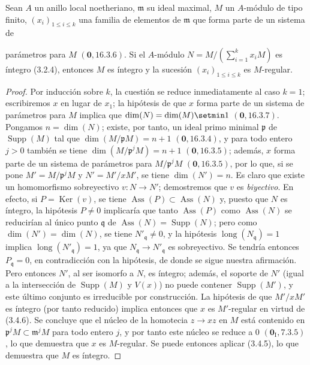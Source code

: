 \begin{corollary}[3.4.7]
\label{IV.2.3.4.7-fr}
Sean $A$ un anillo local noetheriano, $\mathfrak m$ su ideal maximal, $M$ un
$A$-módulo de tipo finito, $(x_i)_{1\leqslant i\leqslant k}$ una familia de
elementos de $\mathfrak m$ que forma parte de un sistema de


parámetros para $M$ $(\mathbf{0},16.3.6)$. Si el $A$-módulo
$N=M/(\sum_{i=1}^k x_iM)$
es íntegro \textup{(3.2.4)}, entonces $M$ es íntegro y la sucesión
$(x_i)_{1\leqslant i\leqslant k}$ es $M$-regular.
\end{corollary}

\begin{proof}
Por inducción sobre $k$, la cuestión se reduce inmediatamente al caso $k=1$; escribiremos
$x$ en lugar de $x_1$; la hipótesis de que $x$ forma parte de un sistema de
parámetros para $M$ implica que
$\dim(N)=\dim(M)\setmin 1$ $(\mathbf{0},16.3.7)$. Pongamos $n=\dim(N)$; existe, por tanto,
un ideal primo minimal $\mathfrak p$ de $\operatorname{Supp}(M)$ tal que
$\dim(M/\mathfrak pM)=n+1$ $(\mathbf{0},16.3.4)$, y para todo entero $j>0$ también se
tiene $\dim(M/\mathfrak p^jM)=n+1$ $(\mathbf{0},16.3.5)$; además, $x$ forma parte de
un sistema de parámetros para $M/\mathfrak p^jM$ $(\mathbf{0},16.3.5)$, por lo que,
si se pone $M'=M/\mathfrak p^jM$ y $N'=M'/xM'$, se tiene $\dim(N')=n$. Es
claro que existe un homomorfismo sobreyectivo $v:N\to N'$; demostremos que
$v$ es \emph{biyectivo}. En efecto, si $P=\operatorname{Ker}(v)$, se tiene
$\operatorname{Ass}(P)\subset\operatorname{Ass}(N)$ y, puesto que $N$ es
íntegro, la hipótesis $P\neq0$ implicaría que tanto $\operatorname{Ass}(P)$
como $\operatorname{Ass}(N)$ se reducirían al único punto
$\mathfrak q$ de $\operatorname{Ass}(N)=\operatorname{Supp}(N)$; pero como
$\dim(N')=\dim(N)$, se tiene $N'_{\mathfrak q}\neq0$, y la hipótesis
$\operatorname{long}(N_{\mathfrak q})=1$ implica
$\operatorname{long}(N'_{\mathfrak q})=1$, ya que
$N_{\mathfrak q}\to N'_{\mathfrak q}$ es sobreyectivo. Se tendría entonces
$P_{\mathfrak q}=0$, en contradicción con la hipótesis, de donde se sigue
nuestra afirmación. Pero entonces $N'$, al ser isomorfo a $N$, es íntegro;
además, el soporte de $N'$ (igual a la intersección de
$\operatorname{Supp}(M)$ y $V(x)$) no puede contener
$\operatorname{Supp}(M')$, y este último conjunto es irreducible por
construcción. La hipótesis de que $M'/xM'$ es íntegro (por tanto reducido)
implica entonces que $x$ es $M'$-regular en virtud de (3.4.6). Se concluye
que el núcleo de la homotecia $z\to xz$ en $M$ está contenido en
$\mathfrak p^jM\subset\mathfrak m^jM$ para todo entero $j$, y por tanto este
núcleo se reduce a $0$ $(\mathbf{0}_{\mathrm I},7.3.5)$, lo que demuestra que $x$ es
$M$-regular. Se puede entonces aplicar (3.4.5), lo que demuestra que $M$ es
íntegro.
\end{proof}


